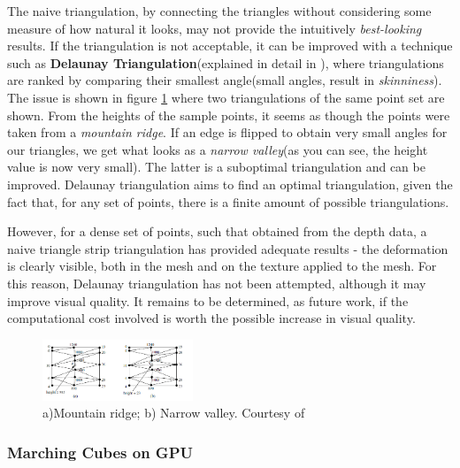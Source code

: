 \documentclass[]{article}
\begin{document}
The naive triangulation, by connecting the triangles without considering some measure of how natural it looks, may not provide the intuitively \textit{best-looking} results. If the triangulation is not acceptable, it can be improved with a technique such as \textbf{Delaunay Triangulation}(explained in detail in \cite[Chapter~9]{berg08}), where triangulations are ranked by comparing their smallest angle(small angles, result in \textit{skinniness}). The issue is shown in figure \ref{fig:MountainRidgeNarrowValley} where two triangulations of the same point set are shown. From the heights of the sample points, it seems as though the points were taken from a \textit{mountain ridge}. If an edge is flipped to obtain very small angles for our triangles, we get what looks as a \textit{narrow valley}(as you can see, the height value is now very small). The latter is a suboptimal triangulation and can be improved. Delaunay triangulation aims to find an optimal triangulation, given the fact that, for any set of points, there is a finite amount of possible triangulations.

However, for a dense set of points, such that obtained from the depth data, a naive triangle strip triangulation has provided adequate results - the deformation is clearly visible, both in the mesh and on the texture applied to the mesh. For this reason, Delaunay triangulation has not been attempted, although it may improve visual quality. It remains to be determined, as future work, if the computational cost involved is worth the possible increase in visual quality.

\begin{figure}[hbtp]
    \centering
    \includegraphics[width=0.4\textwidth]{figures/MountainRidgeNarrowValley.PNG}
    \caption{a)Mountain ridge; b) Narrow valley. Courtesy of \cite[Chapter~9]{berg08}}
    \label{fig:MountainRidgeNarrowValley}
\end{figure}


\subsubsection{Marching Cubes on GPU}
\end{document}
